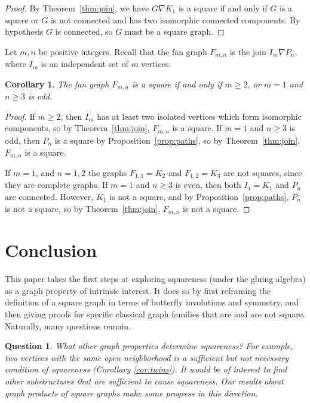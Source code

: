 \documentclass{article}
\newtheorem{corollary}[theorem]{Corollary}
\newtheorem{ques}[theorem]{Question}
\theoremstyle{definition}
\begin{document}
\begin{proof}
By Theorem~\ref{thm:join}, we have $G\nabla K_1$ is a square if and only if $G$ is a square or $G$ is not connected and has two isomorphic connected components. By hypothesis $G$ is connected, so $G$ must be a square graph. 
\end{proof}

Let $m,n$ be positive integers. Recall that the fan graph $F_{m,n}$ is the join $I_m\nabla P_n$, where $I_m$ is an independent set of $m$ vertices.

\begin{corollary} \label{cor:fans}
   The fan graph $F_{m,n}$ is a square if and only if $m\geq 2$, or $m=1$ and $n\geq 3$ is odd.
\end{corollary}

\begin{proof} 

If $m\geq 2$, then $I_m$ has at least two isolated vertices which form isomorphic components, so by Theorem~\ref{thm:join}, $F_{m,n}$ is a square. 
If $m=1$ and $n\geq 3$ is odd, then $P_n$ is a square by Proposition~\ref{prop:paths}, so by Theorem~\ref{thm:join}, $F_{m,n}$ is a square. 

If $m=1$, and $n=1,2$ the graphs $F_{1,1}=K_2$ and $F_{1,2}=K_3$ are not squares, since they are complete graphs. 
If $m=1$ and $n\geq 3$ is even, then both $I_1=K_1$ and $P_n$ are connected. However, $K_1$ is not a square, and by Proposition~\ref{prop:paths}, $P_n$ is not a square, so by Theorem~\ref{thm:join}, $F_{m,n}$ is not a square. 
\end{proof}





\section{Conclusion} \label{sec:conclusion}

This paper takes the first steps at exploring squareness (under the gluing algebra) as a graph property of intrinsic interest.  It does so by first reframing the definition of a square graph in terms of butterfly involutions and symmetry, and then giving proofs for specific classical graph families that are and are not square. Naturally, many questions remain.  

\begin{ques} What other graph properties determine squareness?  For example, two vertices with the same open neighborhood is a sufficient but not necessary condition of squareness (Corollary \ref{cor:twins}).  It would be of interest to find other substructures that are sufficient to cause squareness.  Our results about graph products of square graphs make some progress in this direction. 
\end{ques}
\end{document}
